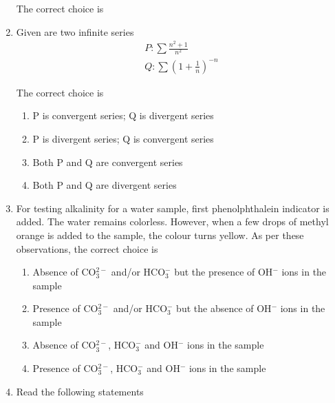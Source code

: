 \documentclass[journal,12pt,onecolumn]{IEEEtran}
\theoremstyle{remark}
\begin{document}
\begin{enumerate}
The correct choice is

\begin{enumerate}
\end{enumerate}
\hfill{}
\item Given are two infinite series 
\begin{align}
P: \sum \frac{n^2 + 1}{n^2} \\
Q: \sum \left( 1 + \frac{1}{n} \right)^{-n}    
\end{align}


The correct choice is

\begin{enumerate}
\item P is convergent series; Q is divergent series
\item P is divergent series; Q is convergent series
\item Both P and Q are convergent series
\item Both P and Q are divergent series
\end{enumerate}
\hfill{}

\item For testing alkalinity for a water sample, first phenolphthalein indicator is added. The water remains colorless. However, when a few drops of methyl orange is added to the sample, the colour turns yellow. As per these observations, the correct choice is

\begin{enumerate}
\item Absence of CO$_3^{2-}$ and/or HCO$_3^-$ but the presence of OH$^-$ ions in the sample
\item Presence of CO$_3^{2-}$ and/or HCO$_3^-$ but the absence of OH$^-$ ions in the sample
\item Absence of CO$_3^{2-}$, HCO$_3^-$ and OH$^-$ ions in the sample
\item Presence of CO$_3^{2-}$, HCO$_3^-$ and OH$^-$ ions in the sample
\end{enumerate}

\newpage

\item Read the following statements


\end{enumerate}
\end{document}
